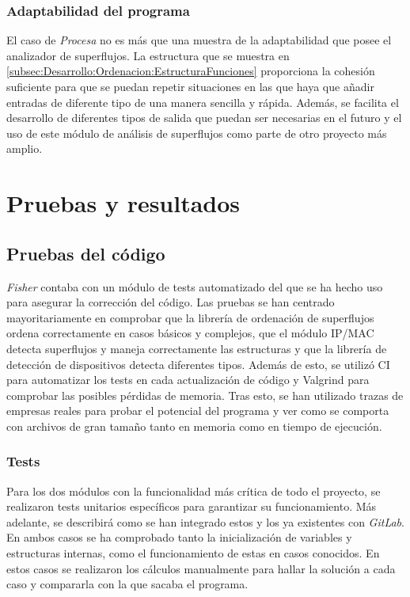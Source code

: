\documentclass[tfg,epsbased,lof,lot,loa,covers,final,copyright,overleaf]{tfgtfmthesisuam}
\begin{document}
\subsection{Adaptabilidad del programa}
El caso de \textit{Procesa} no es más que una muestra de la adaptabilidad que posee el analizador de superflujos. La estructura que se muestra en \ref{subsec:Desarrollo:Ordenacion:EstructuraFunciones} proporciona la cohesión suficiente para que se puedan repetir situaciones en las que haya que añadir entradas de diferente tipo de una manera sencilla y rápida. Además, se facilita el desarrollo de diferentes tipos de salida que puedan ser necesarias en el futuro y el uso de este módulo de análisis de superflujos como parte de otro proyecto más amplio.

\chapter{Pruebas y resultados}

\section{Pruebas del código}
\label{chap:Pruebas:Test}
\textit{Fisher} contaba con un módulo de tests automatizado del que se ha hecho uso para asegurar la corrección del código. Las pruebas se han centrado mayoritariamente en comprobar que la librería de ordenación de superflujos ordena correctamente en casos básicos y complejos, que el módulo IP/MAC detecta superflujos y maneja correctamente las estructuras y que la librería de detección de dispositivos detecta diferentes tipos. Además de esto, se utilizó CI para automatizar los tests en cada actualización de código y Valgrind para comprobar las posibles pérdidas de memoria. Tras esto, se han utilizado trazas de empresas reales para probar el potencial del programa y ver como se comporta con archivos de gran tamaño tanto en memoria como en tiempo de ejecución. 

\subsection{Tests}
\label{subsec:Pruebas:Tests:Tests}

Para los dos módulos con la funcionalidad más crítica de todo el proyecto, se realizaron tests unitarios específicos para garantizar su funcionamiento. Más adelante, se describirá como se han integrado estos y los ya existentes con \textit{GitLab}. En ambos casos se ha comprobado tanto la inicialización de variables y estructuras internas, como el funcionamiento de estas en casos conocidos. En estos casos se realizaron los cálculos manualmente para hallar la solución a cada caso y compararla con la que sacaba el programa.
\end{document}

